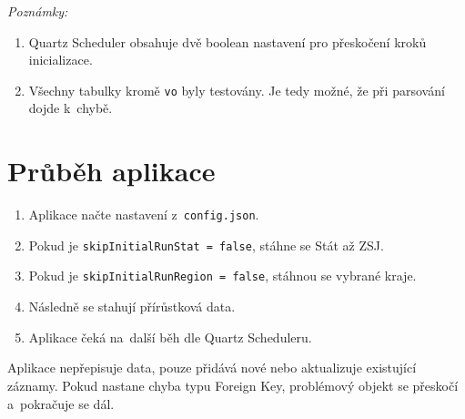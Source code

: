 \textit{Poznámky:}
\begin{enumerate}
  \item Quartz Scheduler obsahuje dvě boolean nastavení pro přeskočení kroků inicializace.
  \item Všechny tabulky kromě \texttt{vo} byly testovány. Je tedy možné, že při parsování dojde k~chybě.
\end{enumerate}

\section*{Průběh aplikace}
\begin{enumerate}
  \item Aplikace načte nastavení z~\texttt{config.json}.
  \item Pokud je \texttt{skipInitialRunStat = false}, stáhne se Stát až ZSJ.
  \item Pokud je \texttt{skipInitialRunRegion = false}, stáhnou se vybrané kraje.
  \item Následně se stahují přírůstková data.
  \item Aplikace čeká na~další běh dle Quartz Scheduleru.
\end{enumerate}

Aplikace nepřepisuje data, pouze přidává nové nebo aktualizuje existující záznamy.  
Pokud nastane chyba typu Foreign Key, problémový objekt se přeskočí a~pokračuje se dál.